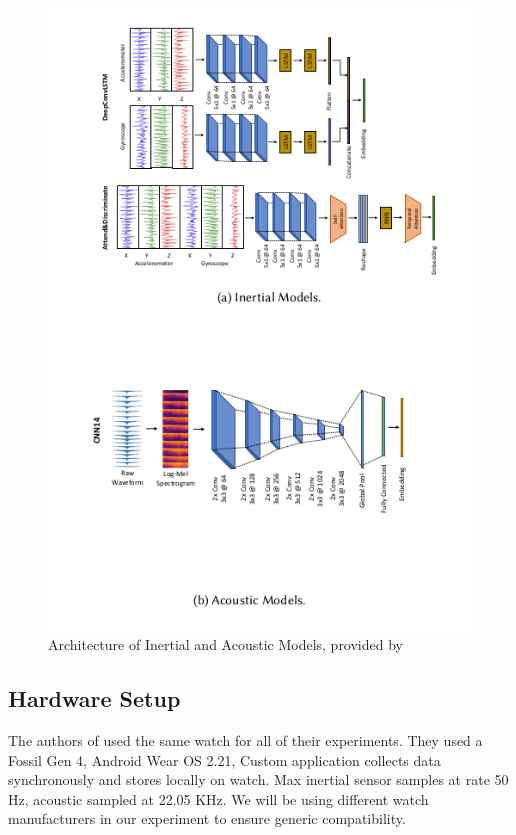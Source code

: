 \documentclass[conference]{IEEEtran}
\begin{document}
\begin{figure}[h]
    \centering
    \includegraphics[scale=0.50]{Architecture_of_Inertial_and_Acoustic_Models}
    \caption{Architecture of Inertial and Acoustic Models, provided by \cite{2022_Leveraging_sound}}
    \label{fig: Architecture_of_Inertial_and_Acoustic_Models}
\end{figure}

\subsection{Hardware Setup}
The authors of \cite{2022_Leveraging_sound} used the same watch for all of their experiments. They used a Fossil Gen 4, Android Wear OS 2.21, Custom application collects data synchronously and stores locally on watch. Max inertial sensor samples at rate 50 Hz, acoustic sampled at 22.05 KHz. We will be using different watch manufacturers in our experiment to ensure generic compatibility.
\end{document}
